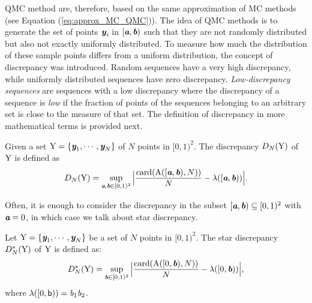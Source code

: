 QMC method are, therefore, based on the same approximation of MC methods (see Equation (\ref{eq:approx_MC_QMC})).
The idea of QMC methods is to generate the set of points $\textit{\textbf{y}}_{\textit{i}}$ in $[\textit{\textbf{a}},\textit{\textbf{b}})$ such that they are not randomly distributed but also not exactly uniformly distributed. 
To measure how much the distribution of these sample points differs from a uniform distribution, the concept of discrepancy was introduced.  
Random sequences have a very high discrepancy, while uniformly distributed sequences have zero discrepancy. 
\textit{Low-discrepancy sequences} are sequences with a low discrepancy \cite{owen2003quasi} where the discrepancy of a sequence is \textit{low} if the fraction of points of the sequences belonging to an arbitrary set is close to the measure of that set.
The definition of discrepancy in more mathematical terms is provided next. 
\begin{definition}
Given a set $\mbox{$\textup{Y}$} = \{\textit{\textbf{y}}_1, \cdots, \textit{\textbf{y}}_N\}$ of $N$ points in $[0,1)^2$. The discrepancy $D_N(\mbox{$\textup{Y}$})$ of $\mbox{$\textup{Y}$}$ is defined as
\begin{equation}
D_N(\mbox{$\textup{Y}$}) = \sup_{\textit{\textbf{a}}, \textit{\textbf{b}}\in[0,1)^2}\Big|\frac{\textrm{card}(\mbox{$\textup{A}$}([\textit{\textbf{a}},\textit{\textbf{b}}), N))}{N}-\lambda([\textit{\textbf{a}}, \textit{\textbf{b}}))\Big|.
\end{equation}
\end{definition} 
Often, it is enough to consider the discrepancy in the subset $[\textit{\textbf{a}},\textit{\textbf{b}})\subseteq[0,1)^2$ with $\textit{\textbf{a}}=0$, in which case we talk about star discrepancy.
 \begin{definition}
Let $\mbox{$\textup{Y}$} = \{\textit{\textbf{y}}_1, \cdots, \textit{\textbf{y}}_N\}$ be a set of $N$ points in $[0,1)^2$. The  star discrepancy $D^*_N(\mbox{$\textup{Y}$})$ of $\mbox{$\textup{Y}$}$ is defined as:
\begin{equation}
D^*_N(\mbox{$\textup{Y}$}) = \sup_{\textit{\textbf{b}}\in[0,1)^2}\Big|\frac{\textrm{card}(\mbox{$\textup{A}$}([0,\textit{\textbf{b}}), N))}{N}-\lambda([0, \textit{\textbf{b}}))\Big|,
\end{equation}
where $\lambda([0, \textsf{b})) = \textit{b}_1\textit{b}_2$. 
\end{definition}
